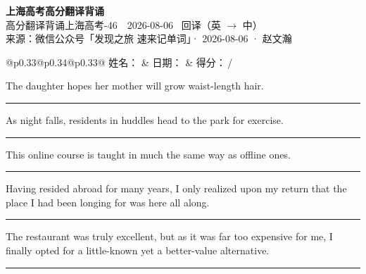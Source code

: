 \documentclass[11pt,a4paper]{article}
\newcommand{\num}[1]{\makebox[1.9em][r]{#1.}\hspace{0.3em}}
\newcommand{\wline}{\noindent\rule{\linewidth}{0.4pt}}
\begin{document}
\pagestyle{plain}
\begin{center}
{\LARGE\bfseries 上海高考高分翻译背诵 }\\[0.25em]
{\large 高分翻译背诵上海高考-46　2026-08-06 \quad\ 回译（英 $\to$ 中）}\\[0.35em]
{\footnotesize 来源：微信公众号「发现之旅 速来记单词」· 2026-08-06 · 赵文瀚}
\end{center}

\vspace{0.4em}
\noindent\begin{tabular}{@{}p{0.33\textwidth}@{}p{0.34\textwidth}@{}p{0.33\textwidth}@{}}
姓名：\underline{\hspace{2.0cm}} & 日期：\underline{\hspace{2.0cm}} & 得分：\underline{\hspace{1.4cm}}\,/ \\
\end{tabular}

\vspace{0.5em}

\vspace{0.8em}
\num{1}The daughter hopes her mother will grow waist-length hair.

\vspace{0.25em}

\wline

\num{2}As night falls, residents in huddles head to the park for exercise.

\vspace{0.25em}

\wline

\num{3}This online course is taught in much the same way as offline ones.

\vspace{0.25em}

\wline

\num{4}Having resided abroad for many years, I only realized upon my return that the place I had been longing for was here all along.

\vspace{0.25em}

\wline

\num{5}The restaurant was truly excellent, but as it was far too expensive for me, I finally opted for a little-known yet a better-value alternative.

\vspace{0.25em}

\wline
\end{document}
